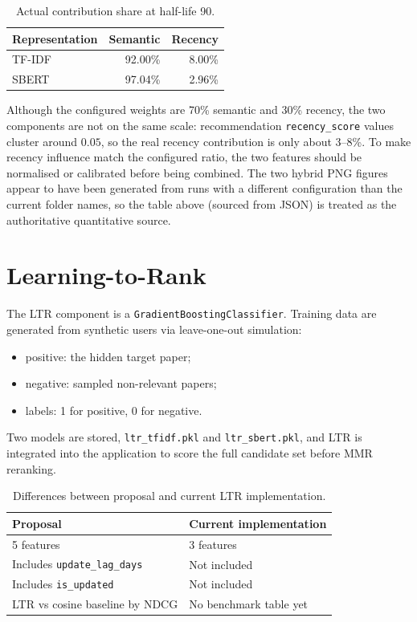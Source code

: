 \documentclass[12pt,a4paper]{article}
\begin{document}
\begin{table}[H]
\centering
\caption{Actual contribution share at half-life 90.}\label{tab:contrib}
\begin{tabular}{lrr}
\toprule
\textbf{Representation} & \textbf{Semantic} & \textbf{Recency}\\
\midrule
TF-IDF & 92.00\% & 8.00\%\\
SBERT  & 97.04\% & 2.96\%\\
\bottomrule
\end{tabular}
\end{table}

Although the configured weights are 70\% semantic and 30\% recency, the two
components are not on the same scale: recommendation \texttt{recency\_score}
values cluster around $0.05$, so the real recency contribution is only about
3--8\%. To make recency influence match the configured ratio, the two features
should be normalised or calibrated before being combined. The two hybrid PNG
figures appear to have been generated from runs with a different configuration
than the current folder names, so the table above (sourced from JSON) is
treated as the authoritative quantitative source.

\section{Learning-to-Rank}

The LTR component is a \texttt{GradientBoostingClassifier}. Training data are
generated from synthetic users via leave-one-out simulation:
\begin{itemize}[leftmargin=1.4em]
  \item positive: the hidden target paper;
  \item negative: sampled non-relevant papers;
  \item labels: 1 for positive, 0 for negative.
\end{itemize}
Two models are stored, \texttt{ltr\_tfidf.pkl} and \texttt{ltr\_sbert.pkl}, and
LTR is integrated into the application to score the full candidate set before
MMR reranking.

\begin{table}[H]
\centering
\caption{Differences between proposal and current LTR implementation.}\label{tab:ltr-diff}
\begin{tabular}{ll}
\toprule
\textbf{Proposal} & \textbf{Current implementation}\\
\midrule
5 features & 3 features\\
Includes \texttt{update\_lag\_days} & Not included\\
Includes \texttt{is\_updated} & Not included\\
LTR vs cosine baseline by NDCG & No benchmark table yet\\
\bottomrule
\end{tabular}
\end{table}
\end{document}

